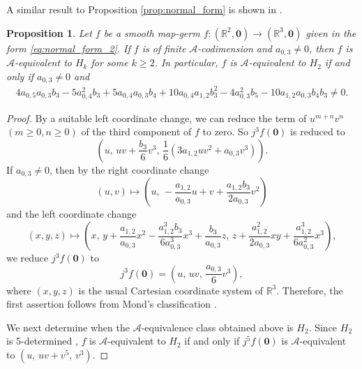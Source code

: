 \documentclass[12pt]{amsart}
\theoremstyle{plain}
\newtheorem{proposition}[theorem]{Proposition}
\theoremstyle{definition}
\newcommand{\R}{\mathbb{R}}
\renewcommand{\geq}{\geqslant}
\begin{document}
A similar result to Proposition \ref{prop:normal_form} is shown in
\cite{MN-B2015}. 

\begin{proposition}
\label{prop:H_k}
Let $f$ be a smooth map-germ $f:(\R^2,\bm{0})\to(\R^3,\bm{0})$ given in the form \eqref{eq:normal_form_2}.
If $f$ is of finite $\mathcal{A}$-codimension and $a_{0,3}\ne0$, then $f$ is $\mathcal{A}$-equivalent to $H_k$ for some $k\geq 2$.
In particular, $f$ is $\mathcal{A}$-equivalent to $H_2$ if and only if $a_{0,3}\ne0$ and 
\begin{align}
\label{eq:H2}
4a_{0,5}a_{0,3}b_3 - 5a_{0,4}^2b_3 + 5a_{0,4}a_{0,3}b_4 + 10 a_{0,4}a_{1,2}b_3^2 - 4a_{0,3}^2b_5 - 10a_{1,2}a_{0,3}b_4b_3 \ne 0.
\end{align}
\end{proposition}
\begin{proof}
By a suitable left coordinate change, we can reduce the term of $u^{m+n}v^n$ $(m\geq 0, n\geq0)$ of the third component of $f$ to zero.
So $j^3 f(\bm{0})$ is reduced to
\[
\left(u,\, u v + \dfrac{b_3}6 v^3,\, \dfrac16(3a_{1,2}u v^2 + a_{0,3}v^3)\right).
\]
If $a_{0,3} \ne 0$, then by the right coordinate change
\[
(u,v) \mapsto \left(u,\, - \dfrac{a_{1,2}}{a_{0,3}} u + v + \dfrac{a_{1,2} b_3}{2 a_{0,3}} v^2\right)
\]
and the left coordinate change
\[
(x,y,z) \mapsto \left(x,\, y + \dfrac{a_{1,2}}{a_{0,3}} x^2 - \dfrac{a_{1,2}^3 b_3}{6 a_{0,3}^3} x^3 + \dfrac{b_3}{a_{0,3}}z,\, z + \dfrac{a_{1,2}^2}{2 a_{0,3}} x y + \dfrac{a_{1,2}^3}{6 a_{0,3}^2} x^3
\right),
\]
we reduce $j^3 f(\bm{0})$ to
\[
j^3 f(\bm{0}) = \left(u,\, u v,\, \dfrac{a_{0,3}}6 v^3
\right),
\]
where $(x,y,z)$ is the usual Cartesian coordinate system of $\R^3$.
Therefore, the first assertion follows from Mond's classification \cite[Theorem 4.2.1:2(a)]{Mond1985}.

We next determine when the $\mathcal{A}$-equivalence class obtained
above is $H_2$. 
Since $H_2$ is 5-determined \cite[Theorem 4.2.1:2(b)]{Mond1985}, $f$ is $\mathcal{A}$-equivalent to $H_2$ if and only if $j^5 f(\bm{0})$ is $\mathcal{A}$-equivalent to $(u,\,u v + v^5,\,v^3)$. 


\end{proof}
\end{document}
